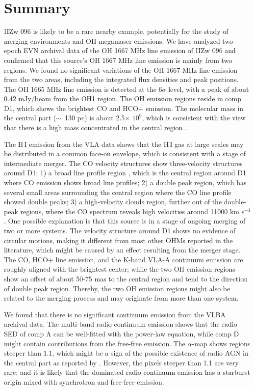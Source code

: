 \documentclass[]{aa} %
\newcommand{\kms}{km s$^{-1}$\xspace}
\newcommand{\HI}{{\rm H\,{\scriptsize I}}\xspace}
\begin{document}
\section{Summary}
IIZw 096 is likely to be a rare nearby example, potentially for the study of merging environments and OH megamaser emissions. We have analyzed two-epoch EVN archival data of the OH 1667 MHz line emission of IIZw 096 and confirmed that this source's OH 1667 MHz line emission is mainly from two regions. We found no significant variations of the OH 1667 MHz line emission from the two areas, including the integrated flux densities and peak positions. The OH 1665 MHz line emission is detected at the 6$\sigma$ level, with a peak of about 0.42 mJy/beam from the OH1 region.
 The OH emission regions reside in comp D1, which shows the brightest CO and HCO+ emission. The molecular mass in the central part ($\sim$~130 pc) is about 2.5$\times$ $10^{9}$, which is consistent with the view that there is a high mass concentrated in the central region \citep{2011MNRAS.416.1267M,2010AJ....140...63I}.

 The \HI emission from the VLA data shows that the \HI gas at large scales may be distributed in a common face-on envelope, which is consistent with a stage of intermediate merger. The CO velocity structures show
 three-velocity structures around D1: 1) a broad line profile region , which is the central region around D1 where CO emission shows broad line profiles; 2) a double peak region, which has several small areas surrounding the central region where the CO line profile showed double peaks; 3) a high-velocity clouds region, further out of the double-peak regions, where the CO spectrum reveals high velocities around 11000 \kms.  One possible explanation is that this source is in a stage of ongoing merging of two or more systems. The velocity structure around D1 shows no evidence of  circular motions, making it different from most other OHMs reported in the literature, which might be caused by an effect resulting from the merger stage. The CO, HCO+ line emission, and the K-band VLA-A continuum emission are roughly aligned with the brightest center; while the two OH emission regions show an offset of about 50-75 mas to the central region and tend to the direction of double peak region. Thereby, the two OH emission regions might also be related to the merging process and may originate from more than one system.

We found that there is no significant continuum emission from the VLBA archival data. The multi-band radio continuum emission shows that the radio SED of comp A can be well-fitted with the power-law equation, while comp D might contain contributions from the free-free emission.  The $\alpha$-map shows regions steeper than 1.1,  which might be a sign of the possible existence of radio AGN in the central part as reported by \cite{2015A&A...574A...4V}. However, the pixels steeper than 1.1 are very rare; and it is likely that the dominated radio continuum emission has a starburst origin mixed with synchrotron and free-free emission.
\end{document}
